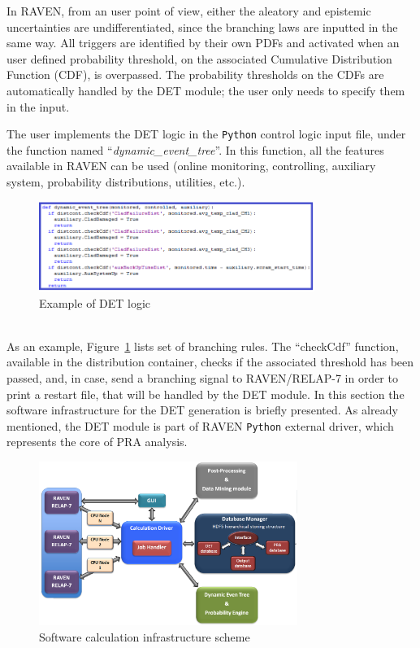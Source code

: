 \documentclass{mc2013}
\begin{document}
In RAVEN, from an user point of view, either the aleatory and epistemic uncertainties are undifferentiated, since the branching laws are inputted in the same way. All triggers are identified by their own PDFs and activated when an user defined probability threshold, on the associated Cumulative Distribution Function (CDF), is overpassed.
The probability thresholds on the CDFs are automatically handled by the DET module; the user only needs to specify them in the input.

The user implements the DET logic in the \verb!Python! control logic input file, under the function named ``\emph{dynamic\_event\_tree}''. In this function, all the features available in RAVEN can be used (online monitoring, controlling, auxiliary system, probability distributions, utilities, etc.). 
\begin{figure}[h] 
  \centering
     \includegraphics[width=0.8\textwidth]{figures/BranchingLaws.png}
  \caption{Example of DET logic}
   \label{fig:DET_branchLaws}
\end{figure}
\\As an example, Figure~\ref{fig:DET_branchLaws} lists set of branching rules. The ``checkCdf'' function, available in the distribution container, checks if the associated threshold has been passed, and, in case, send a branching signal to RAVEN/RELAP-7 in order to print a restart file, that will be handled by the DET module. 
\label{sec:CPUInfrastructure}
In this section the software infrastructure for the DET generation is briefly presented. As already mentioned, the DET module is part of RAVEN \verb!Python! external driver, which represents the core of PRA analysis.
\begin{figure}[h] 
  \centering
     \includegraphics[width=0.75\textwidth]{figures/softwareCalcStructure.png}
  \caption{Software calculation infrastructure scheme}
   \label{fig:softwareInfrastructure}
\end{figure} 
\end{document}
